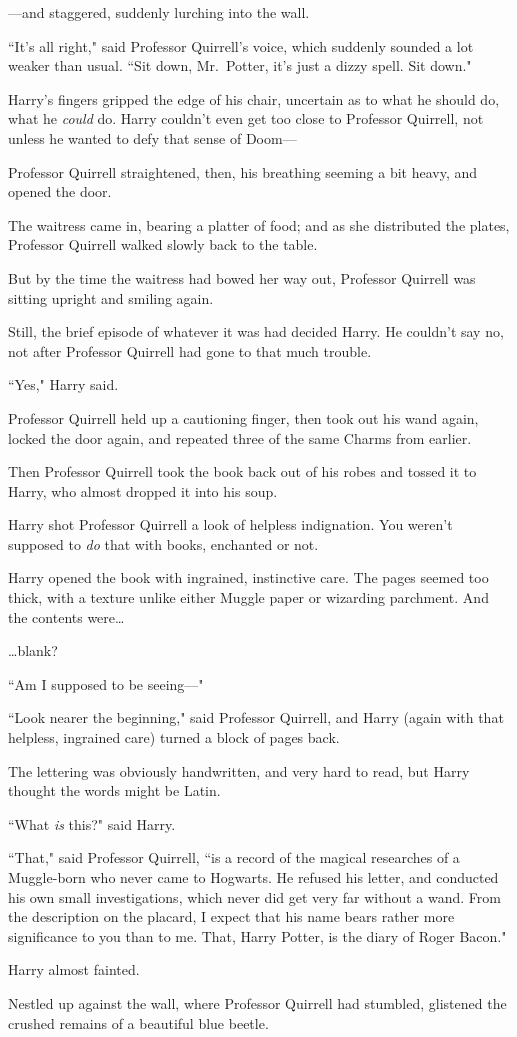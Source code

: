 —and staggered, suddenly lurching into the wall.

``It's all right," said Professor Quirrell's voice, which suddenly sounded a lot weaker than usual. ``Sit down, Mr.~Potter, it's just a dizzy spell. Sit down."

Harry's fingers gripped the edge of his chair, uncertain as to what he should do, what he \emph{could} do. Harry couldn't even get too close to Professor Quirrell, not unless he wanted to defy that sense of Doom—

Professor Quirrell straightened, then, his breathing seeming a bit heavy, and opened the door.

The waitress came in, bearing a platter of food; and as she distributed the plates, Professor Quirrell walked slowly back to the table.

But by the time the waitress had bowed her way out, Professor Quirrell was sitting upright and smiling again.

Still, the brief episode of whatever it was had decided Harry. He couldn't say no, not after Professor Quirrell had gone to that much trouble.

``Yes," Harry said.

Professor Quirrell held up a cautioning finger, then took out his wand again, locked the door again, and repeated three of the same Charms from earlier.

Then Professor Quirrell took the book back out of his robes and tossed it to Harry, who almost dropped it into his soup.

Harry shot Professor Quirrell a look of helpless indignation. You weren't supposed to \emph{do} that with books, enchanted or not.

Harry opened the book with ingrained, instinctive care. The pages seemed too thick, with a texture unlike either Muggle paper or wizarding parchment. And the contents were{\ldots}

{\ldots}blank?

``Am I supposed to be seeing—"

``Look nearer the beginning," said Professor Quirrell, and Harry (again with that helpless, ingrained care) turned a block of pages back.

The lettering was obviously handwritten, and very hard to read, but Harry thought the words might be Latin.

``What \emph{is} this?" said Harry.

``That," said Professor Quirrell, ``is a record of the magical researches of a Muggle-born who never came to Hogwarts. He refused his letter, and conducted his own small investigations, which never did get very far without a wand. From the description on the placard, I expect that his name bears rather more significance to you than to me. That, Harry Potter, is the diary of Roger Bacon."

Harry almost fainted.

Nestled up against the wall, where Professor Quirrell had stumbled, glistened the crushed remains of a beautiful blue beetle.

